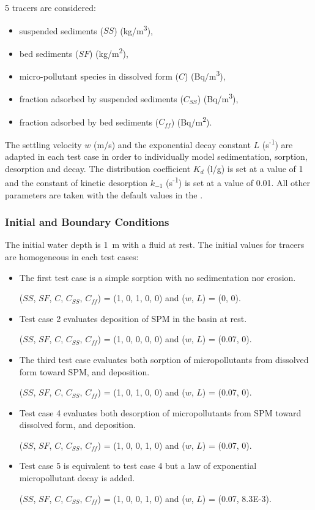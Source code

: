 5 tracers are considered:
\begin{itemize}
\item suspended sediments ($SS$) (kg/m\textsuperscript{3}),
\item bed sediments ($SF$) (kg/m\textsuperscript{2}),
\item micro-pollutant species in dissolved form ($C$) (Bq/m\textsuperscript{3}),
\item fraction adsorbed by suspended sediments ($C_{SS}$) (Bq/m\textsuperscript{3}),
\item fraction adsorbed by bed sediments ($C_{ff}$) (Bq/m\textsuperscript{2}).
\end{itemize}

The settling velocity $w$ (m/s) and the exponential decay constant $L$
(s\textsuperscript{-1}) are adapted in each test case in order to individually
model sedimentation, sorption, desorption and decay. The distribution
coefficient $K_d$ (l/g) is set at a value of 1 and the constant of kinetic
desorption $k_{-1}$ (s\textsuperscript{-1}) is set at a value of 0.01. All other parameters
are taken with the default values in the \waqtel {}.

\subsubsection{Initial and Boundary Conditions}
The initial water depth is 1~m with a fluid at rest.
The initial values for tracers are homogeneous in each test cases:\\
\begin{itemize}
  \item
    The first test case is a simple sorption with no sedimentation nor erosion.

    ($SS$, $SF$, $C$, $C_{SS}$, $C_{ff}$) = (1, 0, 1, 0, 0) and ($w$, $L$) = (0, 0).\\
  \item
    Test case 2 evaluates deposition of SPM in the basin at rest.

($SS$, $SF$, $C$, $C_{SS}$, $C_{ff}$) = (1, 0, 0, 0, 0) and ($w$, $L$) = (0.07, 0).\\
\item
  The third test case evaluates both sorption of micropollutants from
  dissolved form toward SPM, and deposition.

($SS$, $SF$, $C$, $C_{SS}$, $C_{ff}$) = (1, 0, 1, 0, 0) and ($w$, $L$) = (0.07, 0).\\
  \item
    Test case 4 evaluates both desorption of micropollutants from SPM
    toward dissolved form, and deposition.

 ($SS$, $SF$, $C$, $C_{SS}$, $C_{ff}$) = (1, 0, 0, 1, 0) and ($w$, $L$) = (0.07, 0).\\
  \item
    Test case 5 is equivalent to test case 4 but a law of exponential
    micropollutant decay is added.

($SS$, $SF$, $C$, $C_{SS}$, $C_{ff}$) = (1, 0, 0, 1, 0) and ($w$, $L$) = (0.07, 8.3E-3).\\
\end{itemize}


